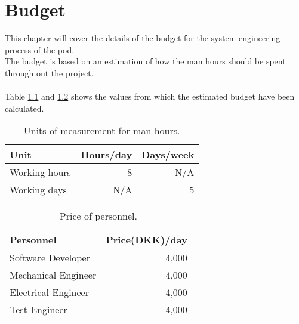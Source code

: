 %
\thispagestyle{fancy}
\chapter{Budget}
\label{chp:budget}

This chapter will cover the details of the budget for the system engineering process of the pod. \\
The budget is based on an estimation of how the man hours should be spent through out the project.\\\\
Table \ref{tb:units} and \ref{tb:price} shows the values from which the estimated budget have been calculated.
\begin{table}[ht]
    \centering
    \begin{tabular}{|l|r|r|}
        \hline
        \textbf{Unit} & \textbf{Hours/day} & \textbf{Days/week} \\
        \hline
        Working hours & 8 & N/A \\
        Working days & N/A & 5 \\
        \hline
    \end{tabular}
    \caption{Units of measurement for man hours.}
    \label{tb:units} 
\end{table}

\begin{table}[ht]
    \centering
    \begin{tabular}{|l|r|}
        \hline
        \textbf{Personnel} & \textbf{Price(DKK)/day} \\
        \hline
        Software Developer & 4,000  \\
        Mechanical Engineer & 4,000 \\
        Electrical Engineer & 4,000 \\
        Test Engineer & 4,000 \\
        \hline
    \end{tabular}
    \caption{Price of personnel.}
    \label{tb:price} 
\end{table}

